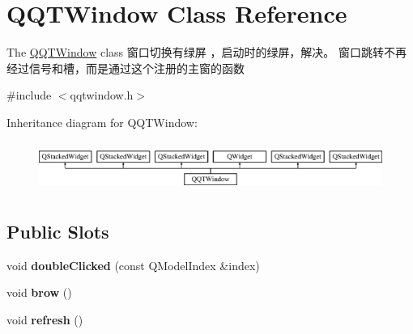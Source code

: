 \hypertarget{class_q_q_t_window}{}\section{Q\+Q\+T\+Window Class Reference}
\label{class_q_q_t_window}


The \mbox{\hyperlink{class_q_q_t_window}{Q\+Q\+T\+Window}} class 窗口切换有绿屏 ，启动时的绿屏，解决。 窗口跳转不再经过信号和槽，而是通过这个注册的主窗的函数  




{\ttfamily \#include $<$qqtwindow.\+h$>$}

Inheritance diagram for Q\+Q\+T\+Window\+:\begin{figure}[H]
\begin{center}
\leavevmode
\includegraphics[height=1.651917cm]{class_q_q_t_window}
\end{center}
\end{figure}
\subsection*{Public Slots}
\begin{DoxyCompactItemize}
\item 
\mbox{\label{class_q_q_t_window_a37e33f2fbaee4c93bda1512d53d5cd6d}} 
void {\bfseries double\+Clicked} (const Q\+Model\+Index \&index)
\item 
\mbox{\label{class_q_q_t_window_a62b48165d5d2f776cbab774310e55f2a}} 
void {\bfseries brow} ()
\item 
\mbox{\label{class_q_q_t_window_ad60f6f59ad36fbf92f600dd373e24ea4}} 
void {\bfseries refresh} ()
\end{DoxyCompactItemize}
